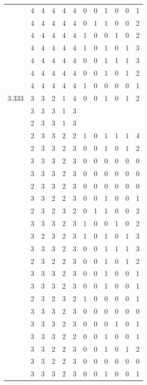 \documentclass[]{msu-thesis}
\theoremstyle{definition}
\theoremstyle{definition}
\theoremstyle{definition}
\theoremstyle{remark}
\begin{document}
\begin{table}
{\begin{tabular}[t]{rrrrrrrrrrrr}
 & 4 & 4 & 4 & 4 & 4 & 0 & 0 & 1 & 0 & 0 & 1\\
 & 4 & 4 & 4 & 4 & 4 & 0 & 1 & 1 & 0 & 0 & 2\\
 & 4 & 4 & 4 & 4 & 4 & 1 & 0 & 0 & 1 & 0 & 2\\
 & 4 & 4 & 4 & 4 & 4 & 1 & 0 & 1 & 0 & 1 & 3\\
 & 4 & 4 & 4 & 4 & 4 & 0 & 0 & 1 & 1 & 1 & 3\\
 & 4 & 4 & 4 & 4 & 4 & 0 & 0 & 1 & 0 & 1 & 2\\
 & 4 & 4 & 4 & 4 & 4 & 1 & 0 & 0 & 0 & 0 & 1\\
3.333 & 3 & 3 & 2 & 1 & 4 & 0 & 0 & 1 & 0 & 1 & 2\\
 & 3 & 3 & 3 & 1 & 3 &  &  &  &  &  & \\
 & 2 & 3 & 3 & 1 & 3 &  &  &  &  &  & \\
 & 2 & 3 & 3 & 2 & 2 & 1 & 0 & 1 & 1 & 1 & 4\\
 & 2 & 3 & 3 & 2 & 3 & 0 & 0 & 1 & 0 & 1 & 2\\
 & 3 & 3 & 3 & 2 & 3 & 0 & 0 & 0 & 0 & 0 & 0\\
 & 3 & 3 & 3 & 2 & 3 & 0 & 0 & 0 & 0 & 0 & 0\\
 & 2 & 3 & 3 & 2 & 3 & 0 & 0 & 0 & 0 & 0 & 0\\
 & 3 & 3 & 2 & 2 & 3 & 0 & 0 & 1 & 0 & 0 & 1\\
 & 2 & 3 & 2 & 3 & 2 & 0 & 1 & 1 & 0 & 0 & 2\\
 & 3 & 3 & 3 & 2 & 3 & 1 & 0 & 0 & 1 & 0 & 2\\
 & 3 & 2 & 3 & 2 & 3 & 1 & 0 & 1 & 0 & 1 & 3\\
 & 3 & 3 & 3 & 2 & 3 & 0 & 0 & 1 & 1 & 1 & 3\\
 & 2 & 3 & 2 & 2 & 3 & 0 & 0 & 1 & 0 & 1 & 2\\
 & 3 & 3 & 3 & 2 & 3 & 0 & 0 & 1 & 0 & 0 & 1\\
 & 3 & 3 & 3 & 2 & 3 & 0 & 0 & 1 & 0 & 0 & 1\\
 & 2 & 3 & 2 & 3 & 2 & 1 & 0 & 0 & 0 & 0 & 1\\
 & 3 & 3 & 3 & 2 & 3 & 0 & 0 & 0 & 0 & 0 & 0\\
 & 3 & 3 & 3 & 2 & 3 & 0 & 0 & 0 & 1 & 0 & 1\\
 & 3 & 3 & 3 & 2 & 2 & 0 & 0 & 1 & 0 & 0 & 1\\
 & 3 & 3 & 2 & 2 & 3 & 0 & 0 & 1 & 0 & 1 & 2\\
 & 3 & 3 & 2 & 2 & 3 & 0 & 0 & 0 & 0 & 0 & 0\\
 & 3 & 3 & 3 & 2 & 3 & 0 & 0 & 1 & 0 & 0 & 1\\

\end{tabular}}
\end{table}
\end{document}

